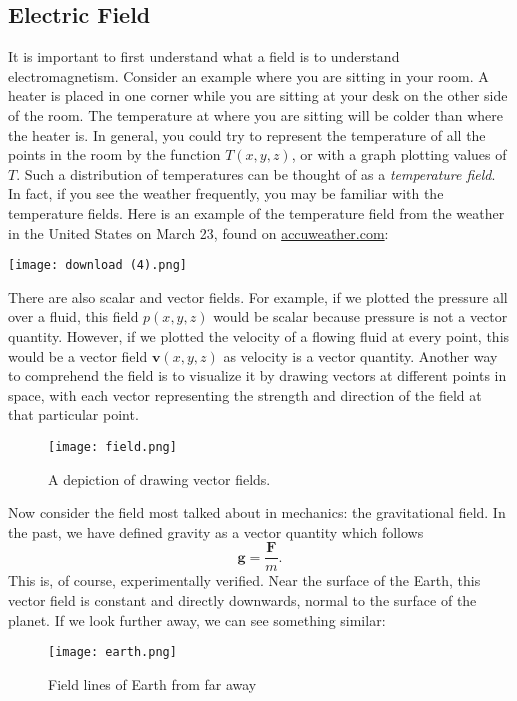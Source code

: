 \documentclass[12pt]{article}
\let\vec\mathbf
\begin{document}
  \subsection{Electric Field}
  It is important to first understand what a field is to understand electromagnetism. Consider an example where you are sitting in your room. A heater is placed in one corner while you are sitting at your desk on the other side of the room. The temperature at where you are sitting will be colder than where the heater is. In general, you could try to represent the temperature of all the points in the room by the function $T (x, y, z)$, or with a graph plotting values of $T$. Such a distribution of temperatures can be thought of as a \textit{temperature field}. In fact, if you see the weather frequently, you may be familiar with the temperature fields. Here is an example of the temperature field from the weather in the United States on March 23, found on \href{https://www.accuweather.com/en/us/national/current-weather-maps}{accuweather.com}: 
  \begin{center}
      \texttt{[image: download (4).png]}
  \end{center}
  There are also scalar and vector fields. For example, if we plotted the pressure all over a fluid, this field $p (x, y, z)$ would be scalar because pressure is not a vector quantity. However, if we plotted the velocity of a flowing fluid at every point, this would be a vector field $\vec v (x, y, z)$ as velocity is a vector quantity. Another way to comprehend the field is to visualize it by drawing vectors at different points in space, with each vector representing the strength and direction of the field at that particular point.
      \begin{figure}[H]
  \centering
      \texttt{[image: field.png]}
      \caption{A depiction of drawing vector fields.}
  \end{figure}
  Now consider the field most talked about in mechanics: the gravitational field. In the past, we have defined gravity as a vector quantity which follows 
  \[\vec g = \frac{\vec F}{m}.\]
  This is, of course, experimentally verified. Near the surface of the Earth, this vector field is constant and directly downwards, normal to the surface of the planet. If we look further away, we can see something similar:
        \begin{figure}[H]
  \centering
      \texttt{[image: earth.png]}
      \caption{Field lines of Earth from far away}
  \end{figure}
\end{document}
